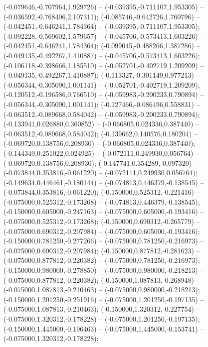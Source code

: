  (-0.079646,-0.707964,1.929726) -- (-0.039395,-0.711107,1.953305) -- (-0.036592,-0.768406,2.107311);
 (-0.085746,-0.642726,1.760796) -- (-0.042451,-0.646241,1.784364) -- (-0.039395,-0.711107,1.953305);
 (-0.092228,-0.569602,1.579657) -- (-0.045706,-0.573413,1.603226) -- (-0.042451,-0.646241,1.784364);
 (-0.099045,-0.488266,1.387286) -- (-0.049135,-0.492267,1.410887) -- (-0.045706,-0.573413,1.603226);
 (-0.106118,-0.398666,1.185510) -- (-0.052701,-0.402719,1.209209) -- (-0.049135,-0.492267,1.410887);
 (-0.113327,-0.301149,0.977213) -- (-0.056344,-0.305090,1.001141) -- (-0.052701,-0.402719,1.209209);
 (-0.120512,-0.196586,0.766510) -- (-0.059983,-0.200233,0.790894) -- (-0.056344,-0.305090,1.001141);
 (-0.127466,-0.086496,0.558831) -- (-0.063512,-0.089668,0.584042) -- (-0.059983,-0.200233,0.790894);
 (-0.133941,0.026880,0.360852) -- (-0.066805,0.024336,0.387440) -- (-0.063512,-0.089668,0.584042);
 (-0.139662,0.140576,0.180204) -- (-0.069720,0.138756,0.208930) -- (-0.066805,0.024336,0.387440);
 (-0.144349,0.251022,0.024925) -- (-0.072111,0.249930,0.056764) -- (-0.069720,0.138756,0.208930);
 (-0.147741,0.354289,-0.097320) -- (-0.073844,0.353816,-0.061220) -- (-0.072111,0.249930,0.056764);
 (-0.149634,0.446461,-0.180144) -- (-0.074813,0.446379,-0.138545) -- (-0.073844,0.353816,-0.061220);
 (-0.150000,0.525312,-0.221416) -- (-0.075000,0.525312,-0.173268) -- (-0.074813,0.446379,-0.138545);
 (-0.150000,0.605000,-0.247163) -- (-0.075000,0.605000,-0.193416) -- (-0.075000,0.525312,-0.173268);
 (-0.150000,0.690312,-0.265779) -- (-0.075000,0.690312,-0.207984) -- (-0.075000,0.605000,-0.193416);
 (-0.150000,0.781250,-0.277266) -- (-0.075000,0.781250,-0.216973) -- (-0.075000,0.690312,-0.207984);
 (-0.150000,0.877812,-0.281623) -- (-0.075000,0.877812,-0.220382) -- (-0.075000,0.781250,-0.216973);
 (-0.150000,0.980000,-0.278850) -- (-0.075000,0.980000,-0.218213) -- (-0.075000,0.877812,-0.220382);
 (-0.150000,1.087813,-0.268948) -- (-0.075000,1.087813,-0.210463) -- (-0.075000,0.980000,-0.218213);
 (-0.150000,1.201250,-0.251916) -- (-0.075000,1.201250,-0.197135) -- (-0.075000,1.087813,-0.210463);
 (-0.150000,1.320312,-0.227754) -- (-0.075000,1.320312,-0.178228) -- (-0.075000,1.201250,-0.197135);
 (-0.150000,1.445000,-0.196463) -- (-0.075000,1.445000,-0.153741) -- (-0.075000,1.320312,-0.178228);
